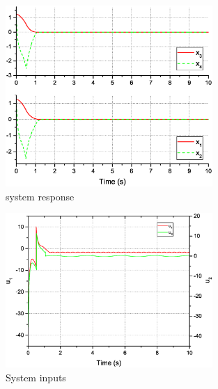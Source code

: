 \documentclass[3p]{elsarticle}
\theoremstyle{plain}
\theoremstyle{remark}
\begin{document}
\begin{figure}
\centering
\includegraphics[width=0.7\textwidth]{paper3_fig2_20161108.eps}
\caption{system response}
\label{Figure:2_20161108}
\end{figure}

\begin{figure}
\centering
\includegraphics[width=0.7\textwidth]{paper3_fig3.eps}
\caption{System inputs}
\label{Figure:3}
\end{figure}
\end{document}
